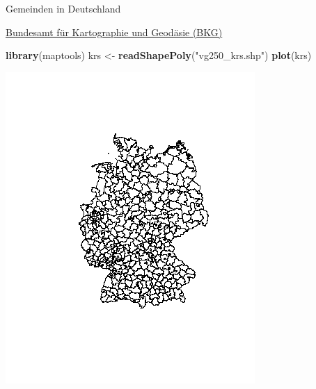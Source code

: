 \documentclass[ignorenonframetext,]{beamer}
\newenvironment{Shaded}{\begin{snugshade}}{\end{snugshade}}
\newcommand{\KeywordTok}[1]{\textcolor[rgb]{0.13,0.29,0.53}{\textbf{#1}}}
\newcommand{\StringTok}[1]{\textcolor[rgb]{0.31,0.60,0.02}{#1}}
\newcommand{\NormalTok}[1]{#1}
\begin{document}
\begin{frame}[fragile]{Gemeinden in Deutschland}

\href{http://www.geodatenzentrum.de/geodaten/gdz_rahmen.gdz_div?gdz_spr=deu\&gdz_akt_zeile=5\&gdz_anz_zeile=1\&gdz_unt_zeile=15\&gdz_user_id=0}{Bundesamt
für Kartographie und Geodäsie (BKG)}

\begin{Shaded}
\begin{Highlighting}[]
\KeywordTok{library}\NormalTok{(maptools)}
\NormalTok{krs <-}\StringTok{ }\KeywordTok{readShapePoly}\NormalTok{(}\StringTok{"vg250_krs.shp"}\NormalTok{)}
\KeywordTok{plot}\NormalTok{(krs)}
\end{Highlighting}
\end{Shaded}

\includegraphics{figure/vg250_krs.png}

\end{frame}
\end{document}
